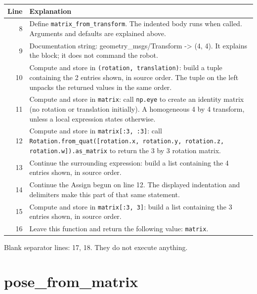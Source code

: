 \documentclass[11pt,a4paper]{book}
\begin{document}
\begin{longtable}{r p{}}

\textbf{Line} & \textbf{Explanation} \\ \hline \endhead

8 & Define \texttt{matrix\_from\_transform}. The indented body runs when called. Arguments and defaults are explained above. \\

9 & Documentation string: geometry\_msgs/Transform -> (4, 4). It explains the block; it does not command the robot. \\

10 & Compute and store in \texttt{(rotation, translation)}: build a tuple containing the 2 entries shown, in source order. The tuple on the left unpacks the returned values in the same order. \\

11 & Compute and store in \texttt{matrix}: call \texttt{np.eye} to create an identity matrix (no rotation or translation initially). A homogeneous 4 by 4 transform, unless a local expression states otherwise. \\

12 & Compute and store in \texttt{matrix[:3, :3]}: call \texttt{Rotation.from\_quat([rotation.x, rotation.y, rotation.z, rotation.w]).as\_matrix} to return the 3 by 3 rotation matrix.  \\

13 & Continue the surrounding expression: build a list containing the 4 entries shown, in source order. \\

14 & Continue the Assign begun on line 12. The displayed indentation and delimiters make this part of that same statement. \\

15 & Compute and store in \texttt{matrix[:3, 3]}: build a list containing the 3 entries shown, in source order.  \\

16 & Leave this function and return the following value: \texttt{matrix}. \\

\end{longtable}

Blank separator lines: 17, 18. They do not execute anything.

\section{pose\_from\_matrix}
\end{document}
